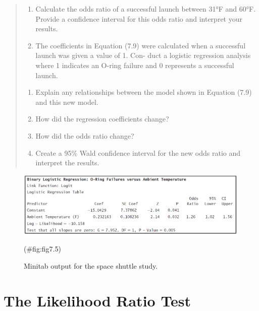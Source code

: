 \documentclass[
]{report}
\providecommand{\tightlist}{%
  \setlength{\itemsep}{0pt}\setlength{\parskip}{0pt}}
\begin{document}
\begin{quote}
\begin{enumerate}
\def\labelenumi{\arabic{enumi}.}
\setcounter{enumi}{11}
\tightlist
\item
  Calculate the odds ratio of a successful launch between 31°F and 60°F. Provide a confidence interval
  for this odds ratio and interpret your results.
\item
  The coefficients in Equation (7.9) were calculated when a successful launch was given a value of 1. Con-
  duct a logistic regression analysis where 1 indicates an O-ring failure and 0 represents a successful launch.
\end{enumerate}

\begin{enumerate}
\def\labelenumi{\alph{enumi}.}
\tightlist
\item
  Explain any relationships between the model shown in Equation (7.9) and this new model.
\item
  How did the regression coefficients change?
\item
  How did the odds ratio change?
\item
  Create a 95\% Wald confidence interval for the new odds ratio and interpret the results.
\end{enumerate}
\end{quote}

\begin{figure}

{\centering \includegraphics[width=1\linewidth]{docs/Fig7_5Minitab} 

}

\caption{Minitab output for the space shuttle study.}(\#fig:fig7.5)
\end{figure}

\section*{The Likelihood Ratio Test}\label{the-likelihood-ratio-test}
\end{document}

